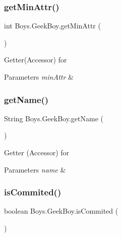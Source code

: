 \subsubsection{\texorpdfstring{get\+Min\+Attr()}{getMinAttr()}}
{\footnotesize\ttfamily int Boys.\+Geek\+Boy.\+get\+Min\+Attr (\begin{DoxyParamCaption}{ }\end{DoxyParamCaption})\hspace{0.3cm}{\ttfamily [inline]}}

Getter(\+Accessor) for 
\begin{DoxyParams}{Parameters}
{\em min\+Attr} & \\
\hline
\end{DoxyParams}
\mbox{\label{class_boys_1_1_geek_boy_a8e4a71f51ec8a010d3497fb665499134}} 
\subsubsection{\texorpdfstring{get\+Name()}{getName()}}
{\footnotesize\ttfamily String Boys.\+Geek\+Boy.\+get\+Name (\begin{DoxyParamCaption}{ }\end{DoxyParamCaption})\hspace{0.3cm}{\ttfamily [inline]}}

Getter (Accessor) for 
\begin{DoxyParams}{Parameters}
{\em name} & \\
\hline
\end{DoxyParams}
\mbox{\label{class_boys_1_1_geek_boy_a36b2502d25e7a47c655e32a61ce45521}} 
\subsubsection{\texorpdfstring{is\+Commited()}{isCommited()}}
{\footnotesize\ttfamily boolean Boys.\+Geek\+Boy.\+is\+Commited (\begin{DoxyParamCaption}{ }\end{DoxyParamCaption})\hspace{0.3cm}{\ttfamily [inline]}}

